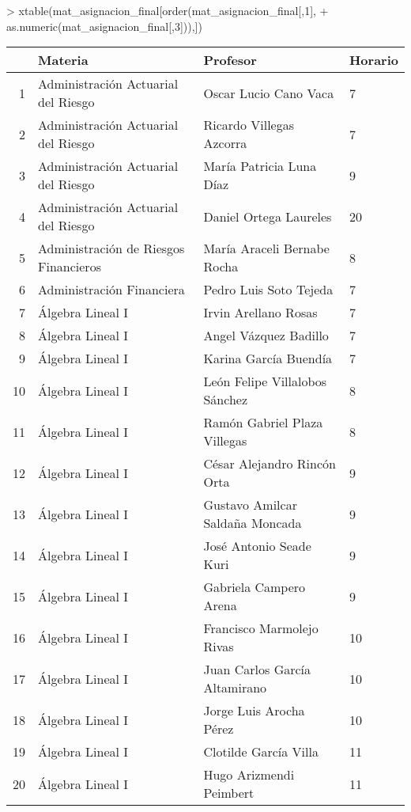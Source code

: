 > xtable(mat_asignacion_final[order(mat_asignacion_final[,1],
+                                   as.numeric(mat_asignacion_final[,3])),])
\begin{table}[ht]
\centering
\begin{tabular}{rlll}
  \hline
 & Materia & Profesor & Horario \\ 
  \hline
1 & Administración Actuarial del Riesgo & Oscar Lucio Cano Vaca & 7 \\ 
  2 & Administración Actuarial del Riesgo & Ricardo Villegas Azcorra & 7 \\ 
  3 & Administración Actuarial del Riesgo & María Patricia Luna Díaz & 9 \\ 
  4 & Administración Actuarial del Riesgo & Daniel Ortega Laureles & 20 \\ 
  5 & Administración de Riesgos Financieros & María Araceli Bernabe Rocha & 8 \\ 
  6 & Administración Financiera & Pedro Luis Soto Tejeda & 7 \\ 
  7 & Álgebra Lineal I & Irvin Arellano Rosas & 7 \\ 
  8 & Álgebra Lineal I & Angel Vázquez Badillo & 7 \\ 
  9 & Álgebra Lineal I & Karina García Buendía & 7 \\ 
  10 & Álgebra Lineal I & León Felipe Villalobos Sánchez & 8 \\ 
  11 & Álgebra Lineal I & Ramón Gabriel Plaza Villegas & 8 \\ 
  12 & Álgebra Lineal I & César Alejandro Rincón Orta & 9 \\ 
  13 & Álgebra Lineal I & Gustavo Amilcar Saldaña Moncada & 9 \\ 
  14 & Álgebra Lineal I & José Antonio Seade Kuri & 9 \\ 
  15 & Álgebra Lineal I & Gabriela Campero Arena & 9 \\ 
  16 & Álgebra Lineal I & Francisco Marmolejo Rivas & 10 \\ 
  17 & Álgebra Lineal I & Juan Carlos García Altamirano & 10 \\ 
  18 & Álgebra Lineal I & Jorge Luis Arocha Pérez & 10 \\ 
  19 & Álgebra Lineal I & Clotilde García Villa & 11 \\ 
  20 & Álgebra Lineal I & Hugo Arizmendi Peimbert & 11 \\ 

\end{tabular}
\end{table}
